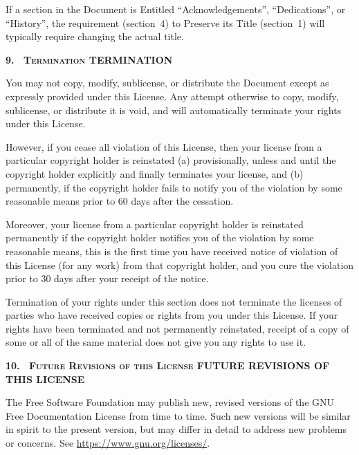 If a section in the Document is Entitled
\enquote{Acknowledgements}, \enquote{Dedications}, or
\enquote{History}, the requirement (section~4) to Preserve
its Title (section~1) will typically require changing the
actual title.

\medskip
\begin{center}
  \textbf{%
    \Large
    9.\
    \ifgfdl@sc
      \textsc{Termination}%
    \else
      TERMINATION%
    \fi
  }%
\end{center}

\noindent
You may not copy, modify, sublicense, or distribute the
Document except as expressly provided under this License.
Any attempt otherwise to copy, modify, sublicense, or
distribute it is void, and will automatically terminate your
rights under this License.

However, if you cease all violation of this License, then
your license from a particular copyright holder is
reinstated (a) provisionally, unless and until the copyright
holder explicitly and finally terminates your license, and
(b) permanently, if the copyright holder fails to notify you
of the violation by some reasonable means prior to 60 days
after the cessation.

Moreover, your license from a particular copyright holder is
reinstated permanently if the copyright holder notifies you
of the violation by some reasonable means, this is the first
time you have received notice of violation of this License
(for any work) from that copyright holder, and you cure the
violation prior to 30 days after your receipt of the
notice.

Termination of your rights under this section does not
terminate the licenses of parties who have received copies
or rights from you under this License. If your rights have
been terminated and not permanently reinstated, receipt of a
copy of some or all of the same material does not give you
any rights to use it.

\medskip
\begin{center}
  \textbf{%
    \Large
    10.\
    \ifgfdl@sc
      \textsc{Future Revisions of this License}%
    \else
      FUTURE REVISIONS OF THIS LICENSE%
    \fi
  }
\end{center}

\noindent
The Free Software Foundation may publish new, revised
versions of the GNU Free Documentation License from time to
time. Such new versions will be similar in spirit to the
present version, but may differ in detail to address new
problems or concerns. See
\url{https://www.gnu.org/licenses/}.

